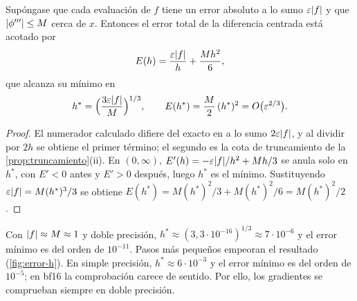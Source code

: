 \begin{proposicion}\label{prop:h-optimo}
Supóngase que cada evaluación de $f$ tiene un error absoluto a lo sumo $\varepsilon\lvert f\rvert$ y que $\lvert\phi'''\rvert\le M$ cerca de $x$. Entonces el error total de la diferencia centrada está acotado por
\[
E(h)=\frac{\varepsilon\lvert f\rvert}{h}+\frac{M h^{2}}{6},
\]
que alcanza su mínimo en
\[
h^{*}=\Bigl(\frac{3\varepsilon\lvert f\rvert}{M}\Bigr)^{1/3},\qquad E(h^{*})=\frac{M}{2}\,(h^{*})^{2}=O\bigl(\varepsilon^{2/3}\bigr).
\]
\end{proposicion}

\begin{proof}
El numerador calculado difiere del exacto en a lo sumo $2\varepsilon\lvert f\rvert$, y al dividir por $2h$ se obtiene el primer término; el segundo es la cota de truncamiento de la \cref{prop:truncamiento}(ii). En $(0,\infty)$, $E'(h)=-\varepsilon\lvert f\rvert/h^{2}+Mh/3$ se anula solo en $h^{*}$, con $E'<0$ antes y $E'>0$ después, luego $h^{*}$ es el mínimo. Sustituyendo $\varepsilon\lvert f\rvert=M(h^{*})^{3}/3$ se obtiene $E(h^{*})=M(h^{*})^{2}/3+M(h^{*})^{2}/6=M(h^{*})^{2}/2$.
\end{proof}

Con $\lvert f\rvert\approx M\approx 1$ y doble precisión, $h^{*}\approx(3{,}3\cdot 10^{-16})^{1/3}\approx 7\cdot 10^{-6}$ y el error mínimo es del orden de $10^{-11}$. Pasos más pequeños empeoran el resultado (\cref{fig:error-h}). En simple precisión, $h^{*}\approx 6\cdot 10^{-3}$ y el error mínimo es del orden de $10^{-5}$; en bf16 la comprobación carece de sentido. Por ello, los gradientes se comprueban siempre en doble precisión.

